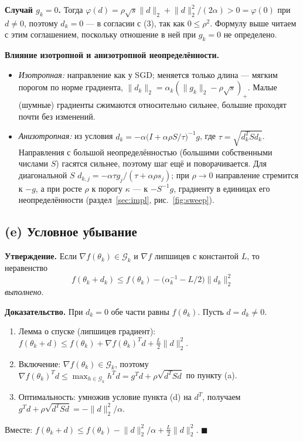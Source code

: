 \documentclass[11pt,a4paper]{article}
\newcommand{\G}{\mathcal{G}_k}
\newcommand{\norm}[1]{\lVert #1\rVert_2}
\begin{document}
\textbf{Случай $g_k=0$.} Тогда $\varphi(d)=\rho\sqrt s\norm d+\norm d^2/(2\alpha)>0=\varphi(0)$ при
$d\ne0$, поэтому $d_k=0$ — в согласии с (3), так как $0\le\rho^2$. Формулу выше читаем с этим
соглашением, поскольку отношение в ней при $g_k=0$ не определено.

\textbf{Влияние изотропной и анизотропной неопределённости.}
\begin{itemize}
\item \emph{Изотропная:} направление как у SGD; меняется только длина — мягким порогом по норме
градиента, $\norm{d_k}=\alpha_k(\norm{g_k}-\rho\sqrt s)_+$. Малые (шумные) градиенты сжимаются
относительно сильнее, большие проходят почти без изменений.
\item \emph{Анизотропная:} из условия $d_k=-\alpha\big(I+\alpha\rho S/\tau\big)^{-1}g$, где
$\tau=\sqrt{d_k^TSd_k}$. Направления с большой неопределённостью (большими собственными числами
$S$) гасятся сильнее, поэтому шаг ещё и поворачивается. Для диагональной $S$
$d_{k,j}=-\alpha\tau g_j/(\tau+\alpha\rho s_j)$; при $\rho\to0$ направление стремится к $-g$, а при
росте $\rho$ к порогу $\kappa$ — к $-S^{-1}g$, градиенту в единицах его неопределённости
(раздел~\ref{sec:impl}, рис.~\ref{fig:sweep}).
\end{itemize}

\subsection{(e) Условное убывание}

\textbf{Утверждение.} Если $\nabla f(\theta_k)\in\G$ и $\nabla f$ липшицев с константой $L$, то
неравенство
\begin{equation*}
f(\theta_k+d_k)\le f(\theta_k)-\big(\alpha_k^{-1}-L/2\big)\norm{d_k}^2
\end{equation*}
\emph{выполнено}.

\textbf{Доказательство.} При $d_k=0$ обе части равны $f(\theta_k)$. Пусть $d=d_k\ne0$.
\begin{enumerate}
\item Лемма о спуске (липшицев градиент):
$f(\theta_k+d)\le f(\theta_k)+\nabla f(\theta_k)^Td+\tfrac L2\norm d^2$.
\item Включение: $\nabla f(\theta_k)\in\G$, поэтому
$\nabla f(\theta_k)^Td\le\max_{h\in\G}h^Td=g^Td+\rho\sqrt{d^TSd}$ по пункту (a).
\item Оптимальность: умножив условие пункта (d) на $d^T$, получаем
$g^Td+\rho\sqrt{d^TSd}=-\norm d^2/\alpha$.
\end{enumerate}
Вместе: $f(\theta_k+d)\le f(\theta_k)-\norm d^2/\alpha+\tfrac L2\norm d^2$. \hfill$\blacksquare$
\end{document}
